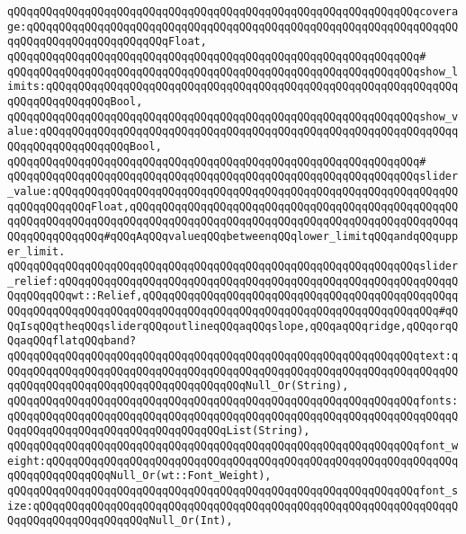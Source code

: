 \verb|qQQqqQQqqQQqqQQqqQQqqQQqqQQqqQQqqQQqqQQqqQQqqQQqqQQqqQQqqQQqqQQqcoverage:qQQqqQQqqQQqqQQqqQQqqQQqqQQqqQQqqQQqqQQqqQQqqQQqqQQqqQQqqQQqqQQqqQQqqQQqqQQqqQQqqQQqqQQqqQQqFloat,|\newline
\verb|qQQqqQQqqQQqqQQqqQQqqQQqqQQqqQQqqQQqqQQqqQQqqQQqqQQqqQQqqQQqqQQq#|\newline
\verb|qQQqqQQqqQQqqQQqqQQqqQQqqQQqqQQqqQQqqQQqqQQqqQQqqQQqqQQqqQQqqQQqshow_limits:qQQqqQQqqQQqqQQqqQQqqQQqqQQqqQQqqQQqqQQqqQQqqQQqqQQqqQQqqQQqqQQqqQQqqQQqqQQqqQQqBool,|\newline
\verb|qQQqqQQqqQQqqQQqqQQqqQQqqQQqqQQqqQQqqQQqqQQqqQQqqQQqqQQqqQQqqQQqshow_value:qQQqqQQqqQQqqQQqqQQqqQQqqQQqqQQqqQQqqQQqqQQqqQQqqQQqqQQqqQQqqQQqqQQqqQQqqQQqqQQqqQQqBool,|\newline
\verb|qQQqqQQqqQQqqQQqqQQqqQQqqQQqqQQqqQQqqQQqqQQqqQQqqQQqqQQqqQQqqQQq#|\newline
\verb|qQQqqQQqqQQqqQQqqQQqqQQqqQQqqQQqqQQqqQQqqQQqqQQqqQQqqQQqqQQqqQQqslider_value:qQQqqQQqqQQqqQQqqQQqqQQqqQQqqQQqqQQqqQQqqQQqqQQqqQQqqQQqqQQqqQQqqQQqqQQqqQQqFloat,qQQqqQQqqQQqqQQqqQQqqQQqqQQqqQQqqQQqqQQqqQQqqQQqqQQqqQQqqQQqqQQqqQQqqQQqqQQqqQQqqQQqqQQqqQQqqQQqqQQqqQQqqQQqqQQqqQQqqQQqqQQqqQQqqQQqqQQq#qQQqAqQQqvalueqQQqbetweenqQQqlower_limitqQQqandqQQqupper_limit.|\newline
\verb|qQQqqQQqqQQqqQQqqQQqqQQqqQQqqQQqqQQqqQQqqQQqqQQqqQQqqQQqqQQqqQQqslider_relief:qQQqqQQqqQQqqQQqqQQqqQQqqQQqqQQqqQQqqQQqqQQqqQQqqQQqqQQqqQQqqQQqqQQqqQQqwt::Relief,qQQqqQQqqQQqqQQqqQQqqQQqqQQqqQQqqQQqqQQqqQQqqQQqqQQqqQQqqQQqqQQqqQQqqQQqqQQqqQQqqQQqqQQqqQQqqQQqqQQqqQQqqQQqqQQqqQQq#qQQqIsqQQqtheqQQqsliderqQQqoutlineqQQqaqQQqslope,qQQqaqQQqridge,qQQqorqQQqaqQQqflatqQQqband?|\newline
\newline
\verb|qQQqqQQqqQQqqQQqqQQqqQQqqQQqqQQqqQQqqQQqqQQqqQQqqQQqqQQqqQQqqQQqtext:qQQqqQQqqQQqqQQqqQQqqQQqqQQqqQQqqQQqqQQqqQQqqQQqqQQqqQQqqQQqqQQqqQQqqQQqqQQqqQQqqQQqqQQqqQQqqQQqqQQqqQQqqQQqNull_Or(String),|\newline
\verb|qQQqqQQqqQQqqQQqqQQqqQQqqQQqqQQqqQQqqQQqqQQqqQQqqQQqqQQqqQQqqQQqfonts:qQQqqQQqqQQqqQQqqQQqqQQqqQQqqQQqqQQqqQQqqQQqqQQqqQQqqQQqqQQqqQQqqQQqqQQqqQQqqQQqqQQqqQQqqQQqqQQqqQQqqQQqList(String),|\newline
\verb|qQQqqQQqqQQqqQQqqQQqqQQqqQQqqQQqqQQqqQQqqQQqqQQqqQQqqQQqqQQqqQQqfont_weight:qQQqqQQqqQQqqQQqqQQqqQQqqQQqqQQqqQQqqQQqqQQqqQQqqQQqqQQqqQQqqQQqqQQqqQQqqQQqqQQqNull_Or(wt::Font_Weight),|\newline
\verb|qQQqqQQqqQQqqQQqqQQqqQQqqQQqqQQqqQQqqQQqqQQqqQQqqQQqqQQqqQQqqQQqfont_size:qQQqqQQqqQQqqQQqqQQqqQQqqQQqqQQqqQQqqQQqqQQqqQQqqQQqqQQqqQQqqQQqqQQqqQQqqQQqqQQqqQQqqQQqNull_Or(Int),|\newline
